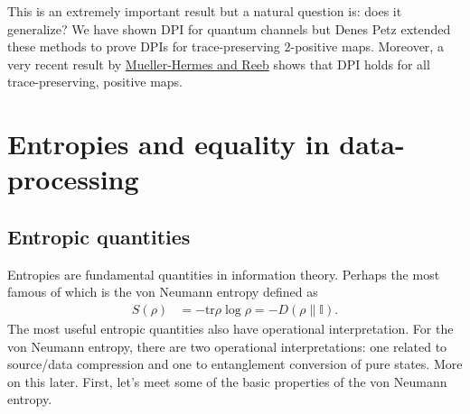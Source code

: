 \documentclass[notoc]{tufte-book}
\begin{document}
This is an extremely important result but a natural question is: does it generalize? We have shown DPI for quantum channels but Denes Petz extended these methods to prove DPIs for trace-preserving $2$-positive maps. Moreover, a very recent result by \href{https://arxiv.org/abs/1512.06117}{Mueller-Hermes and Reeb} shows that DPI holds for all trace-preserving, positive maps.

\chapter{Entropies and equality in data-processing} \label{ch:2-Entropies}

\section{Entropic quantities}\label{sec:entopic-quantities}
Entropies are fundamental quantities in information theory. Perhaps the most famous of which is the von Neumann entropy defined as 
\begin{align}
    S(\rho) &= -\text{tr}\rho \log{\rho} = - D(\rho \| \mathbb{I}).
\end{align}
The most useful entropic quantities also have operational interpretation. For the von Neumann entropy, there are two operational interpretations: one related to source/data compression and one to entanglement conversion of pure states. More on this later. First, let's meet some of the basic properties of the von Neumann entropy.


\setcounter{theorem}{10}
\end{document}
